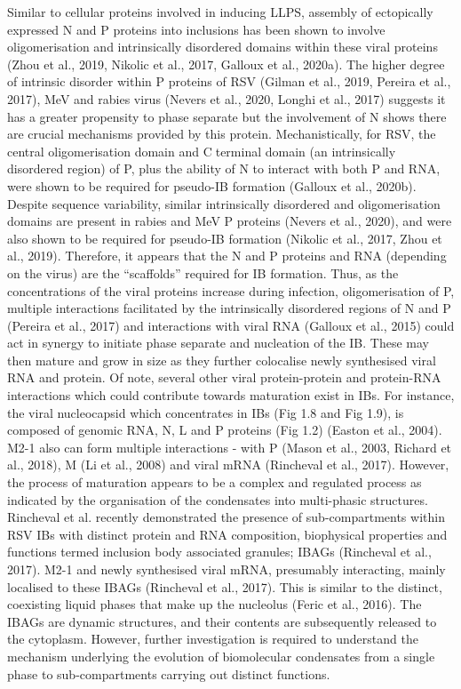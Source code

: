 Similar to cellular proteins involved in inducing LLPS, assembly of ectopically expressed N and P proteins into inclusions has been shown to involve oligomerisation and intrinsically disordered domains within these viral proteins (Zhou et al., 2019, Nikolic et al., 2017, Galloux et al., 2020a). The higher degree of intrinsic disorder within P proteins of RSV (Gilman et al., 2019, Pereira et al., 2017), MeV and rabies virus (Nevers et al., 2020, Longhi et al., 2017) suggests it has a greater propensity to phase separate but the involvement of N shows there are crucial mechanisms provided by this protein. Mechanistically, for RSV, the central oligomerisation domain and Cterminal domain (an intrinsically disordered region) of P, plus the ability of N to interact with both P and RNA, were shown to be required for pseudo-IB formation (Galloux et al., 2020b). Despite sequence variability, similar intrinsically disordered and oligomerisation domains are present in rabies and MeV P proteins (Nevers et al., 2020), and were also shown to be required for pseudo-IB formation (Nikolic et al., 2017, Zhou et al., 2019). Therefore, it appears that the N and P proteins and RNA (depending on the virus) are the “scaffolds” required for IB formation. Thus, as the concentrations of the viral proteins increase during infection, oligomerisation of P, multiple interactions facilitated by the intrinsically disordered regions of N and P (Pereira et al., 2017) and interactions with viral RNA (Galloux et al., 2015) could act in synergy to initiate phase separate and nucleation of the IB. These may then mature and grow in size as they further colocalise newly synthesised viral RNA and protein. Of note, several other viral protein-protein and protein-RNA interactions which could contribute towards maturation exist in IBs. For instance, the viral nucleocapsid which concentrates in IBs (Fig 1.8 and Fig 1.9), is composed of genomic RNA, N, L and P proteins (Fig 1.2) (Easton et al., 2004). M2-1 also can form multiple interactions - with P (Mason et al., 2003, Richard et al., 2018), M (Li et al., 2008) and viral mRNA (Rincheval et al., 2017). However, the process of maturation appears to be a complex and regulated process as indicated by the organisation of the condensates into multi-phasic structures. Rincheval et al. recently demonstrated the presence of sub-compartments within RSV IBs with distinct protein and RNA composition, biophysical properties and functions termed inclusion body associated granules; IBAGs (Rincheval et al., 2017). M2-1 and newly synthesised viral mRNA, presumably interacting, mainly localised to these IBAGs (Rincheval et al., 2017). This is similar to the distinct, coexisting liquid phases that make up the nucleolus (Feric et al., 2016). The IBAGs are dynamic structures, and their contents are subsequently released to the cytoplasm. However, further investigation is required to understand the mechanism underlying the evolution of biomolecular condensates from a single phase to sub-compartments carrying out distinct functions.

